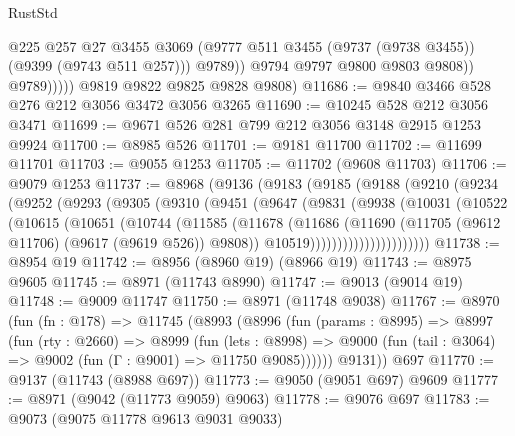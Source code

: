 \begin{lexlean}{RustStd}
\begin{coremodule}
                        @225
                        @257
                        @27
                        @3455
                        @3069
                        (@9777 @511 @3455 (@9737 (@9738 @3455)) (@9399 (@9743 @511 @257)))
                        @9789))
                    @9794
                    @9797
                    @9800
                    @9803
                    @9808))
                @9789)))))
      @9819
      @9822
      @9825
      @9828
      @9808)
@11686 := @9840 @3466 @528 @276 @212 @3056 @3472 @3056 @3265
@11690 := @10245 @528 @212 @3056 @3471
@11699 := @9671 @526 @281 @799 @212 @3056 @3148 @2915 @1253 @9924
@11700 := @8985 @526
@11701 := @9181 @11700
@11702 := @11699 @11701
@11703 := @9055 @1253
@11705 := @11702 (@9608 @11703)
@11706 := @9079 @1253
@11737 := @8968
    (@9136
      (@9183
        (@9185
          (@9188
            (@9210
              (@9234
                (@9252
                  (@9293
                    (@9305
                      (@9310
                        (@9451
                          (@9647
                            (@9831
                              (@9938
                                (@10031
                                  (@10522
                                    (@10615
                                      (@10651
                                        (@10744
                                          (@11585
                                            (@11678
                                              (@11686
                                                (@11690
                                                  (@11705
                                                    (@9612 @11706)
                                                    (@9617 (@9619 @526))
                                                    @9808))
                                                @10519))))))))))))))))))))))
@11738 := @8954 @19
@11742 := @8956 (@8960 @19) (@8966 @19)
@11743 := @8975 @9605
@11745 := @8971 (@11743 @8990)
@11747 := @9013 (@9014 @19)
@11748 := @9009 @11747
@11750 := @8971 (@11748 @9038)
@11767 := @8970
    (fun (fn : @178) =>
    @11745
      (@8993
        (@8996
          (fun (params : @8995) =>
          @8997
            (fun (rty : @2660) =>
            @8999
              (fun (lets : @8998) =>
              @9000 (fun (tail : @3064) => @9002 (fun (Γ : @9001) => @11750 @9085))))))
        @9131))
    @697
@11770 := @9137 (@11743 (@8988 @697))
@11773 := @9050 (@9051 @697) @9609
@11777 := @8971 (@9042 (@11773 @9059) @9063)
@11778 := @9076 @697
@11783 := @9073 (@9075 @11778 @9613 @9031 @9033)

\end{coremodule}
\end{lexlean}
